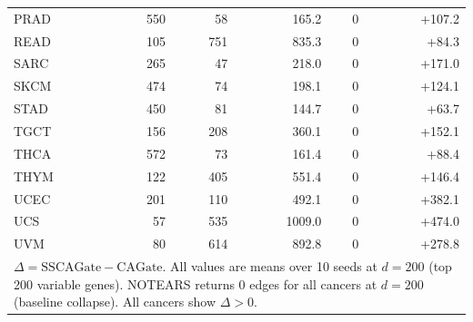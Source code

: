 \documentclass[12pt,a4paper]{article}
\begin{document}
\begin{table}[H]
\begin{tabular}{lrrrrr}
PRAD & 550 & 58  & 165.2 & 0 & +107.2 \\
READ & 105 & 751 & 835.3 & 0 & +84.3 \\
SARC & 265 & 47  & 218.0 & 0 & +171.0 \\
SKCM & 474 & 74  & 198.1 & 0 & +124.1 \\
STAD & 450 & 81  & 144.7 & 0 & +63.7 \\
TGCT & 156 & 208 & 360.1 & 0 & +152.1 \\
THCA & 572 & 73  & 161.4 & 0 & +88.4 \\
THYM & 122 & 405 & 551.4 & 0 & +146.4 \\
UCEC & 201 & 110 & 492.1 & 0 & +382.1 \\
UCS  & 57  & 535 & 1009.0& 0 & +474.0 \\
UVM  & 80  & 614 & 892.8 & 0 & +278.8 \\
\midrule
\multicolumn{6}{p{0.95\textwidth}}{\footnotesize $\Delta = \text{SSCAGate} - \text{CAGate}$. All values are means over 10 seeds at $d=200$ (top 200 variable genes). NOTEARS returns 0 edges for all cancers at $d=200$ (baseline collapse). All cancers show $\Delta > 0$.} \\
\end{tabular}
\end{table}
\end{document}
